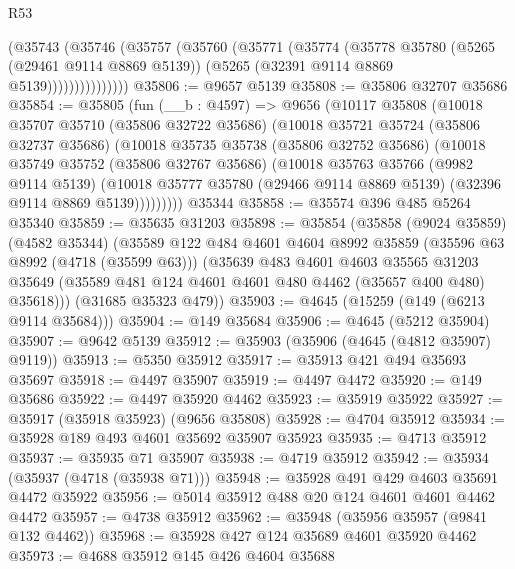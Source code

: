 \begin{lexlean}{R53}
\begin{coremodule}
                (@35743
                  (@35746
                    (@35757
                      (@35760
                        (@35771
                          (@35774
                            (@35778
                              @35780
                              (@5265 (@29461 @9114 @8869 @5139))
                              (@5265 (@32391 @9114 @8869 @5139)))))))))))))))
@35806 := @9657 @5139
@35808 := @35806 @32707 @35686
@35854 := @35805
    (fun (__b : @4597) =>
    @9656
      (@10117
        @35808
        (@10018
          @35707
          @35710
          (@35806 @32722 @35686)
          (@10018
            @35721
            @35724
            (@35806 @32737 @35686)
            (@10018
              @35735
              @35738
              (@35806 @32752 @35686)
              (@10018
                @35749
                @35752
                (@35806 @32767 @35686)
                (@10018
                  @35763
                  @35766
                  (@9982 @9114 @5139)
                  (@10018
                    @35777
                    @35780
                    (@29466 @9114 @8869 @5139)
                    (@32396 @9114 @8869 @5139)))))))))
    @35344
@35858 := @35574 @396 @485 @5264 @35340
@35859 := @35635 @31203
@35898 := @35854
    (@35858
      (@9024 @35859)
      (@4582 @35344)
      (@35589
        @122
        @484
        @4601
        @4604
        @8992
        @35859
        (@35596 @63 @8992 (@4718 (@35599 @63)))
        (@35639
          @483
          @4601
          @4603
          @35565
          @31203
          @35649
          (@35589 @481 @124 @4601 @4601 @480 @4462 (@35657 @400 @480) @35618)))
      (@31685 @35323 @479))
@35903 := @4645 (@15259 (@149 (@6213 @9114 @35684)))
@35904 := @149 @35684
@35906 := @4645 (@5212 @35904)
@35907 := @9642 @5139
@35912 := @35903 (@35906 (@4645 (@4812 @35907) @9119))
@35913 := @5350 @35912
@35917 := @35913 @421 @494 @35693 @35697
@35918 := @4497 @35907
@35919 := @4497 @4472
@35920 := @149 @35686
@35922 := @4497 @35920 @4462
@35923 := @35919 @35922
@35927 := @35917 (@35918 @35923) (@9656 @35808)
@35928 := @4704 @35912
@35934 := @35928 @189 @493 @4601 @35692 @35907 @35923
@35935 := @4713 @35912
@35937 := @35935 @71 @35907
@35938 := @4719 @35912
@35942 := @35934 (@35937 (@4718 (@35938 @71)))
@35948 := @35928 @491 @429 @4603 @35691 @4472 @35922
@35956 := @5014 @35912 @488 @20 @124 @4601 @4601 @4462 @4472
@35957 := @4738 @35912
@35962 := @35948 (@35956 @35957 (@9841 @132 @4462))
@35968 := @35928 @427 @124 @35689 @4601 @35920 @4462
@35973 := @4688 @35912 @145 @426 @4604 @35688

\end{coremodule}
\end{lexlean}
